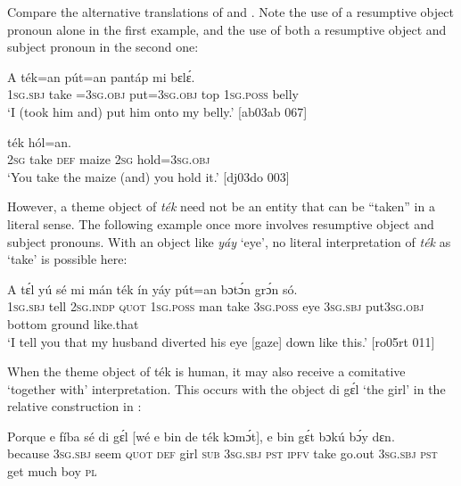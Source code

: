 Compare the alternative translations of  and . Note the use of a resumptive object pronoun alone in the first example, and the use of both a resumptive object and subject pronoun in the second one:



\ea%
    \label{ex:key:1564}
    \gll A    ték=an    pút=an    pantáp  mi    bɛlɛ́.\\
\textsc{1sg.sbj}  take  =\textsc{3sg.obj}  put=\textsc{3sg.obj}  top    \textsc{1sg.poss}  belly\\

\glt ‘I (took him and) put him onto my belly.’ [ab03ab 067]
\z


\ea%
    \label{ex:key:1565}
    \gll {}  ték\textstylePichiexamplebold{}         hól=an.\\
\textsc{2sg}  take    \textsc{def}  maize  \textsc{2sg}  hold=\textsc{3sg.obj}\\

\glt ‘You take the maize (and) you hold it.’ [dj03do 003]
\z

However, a theme object of \textit{ték} need not be an entity that can be “taken” in a literal sense. The following example once more involves resumptive object and subject pronouns. With an object like \textit{yáy} ‘eye’, no literal interpretation of \textit{ték} as ‘take’ is possible here: 


\ea%
    \label{ex:key:1566}
    \gll A    tɛ́l  yú    sé    mi    mán  ték    ín    yáy  
    pút=an    bɔtɔ́n  grɔ́n    só.\\
\textsc{1sg.sbj}  tell  \textsc{2sg.indp}  \textsc{quot}    \textsc{1sg.poss}  man    take    \textsc{3sg.poss}  eye  
\textsc{3sg.sbj}  put\textsc{3sg.obj}  bottom  ground  like.that\\

\glt ‘I tell you that my husband diverted his eye [gaze] down like this.’ [ro05rt 011]
\z

When the theme object of ték is human, it may also receive a comitative ‘together with’ interpretation. This occurs with the object di gɛ́l ‘the girl’ in the relative construction{\fff} in : 


\ea%
    \label{ex:key:1567}
    \gll Porque  e    fíba    sé    di  gɛ́l  [wé  e    bin  de  ték    kɔmɔ́t],
e    bin  gɛ́t  bɔkú  bɔ́y  dɛn.\\
because  \textsc{3sg.sbj}  seem  \textsc{quot}    \textsc{def}  girl   \textsc{sub}  \textsc{3sg.sbj}  \textsc{pst}  \textsc{ipfv}  take    go.out
\textsc{3sg.sbj}  \textsc{pst}  get  much  boy  \textsc{pl}\\

